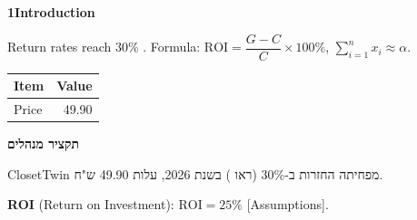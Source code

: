\documentclass[a4paper,11pt]{article}
\begin{document}
{\headfont\bfseries\LARGE 1\quad Introduction}\par\medskip
Return rates reach 30\% \cite{shen2023}. Formula: $\mathrm{ROI}=\dfrac{G-C}{C}\times 100\%$, $\sum_{i=1}^{n} x_i \approx \alpha$.
\begin{center}\begin{tabular}{@{}lr@{}}\toprule Item & Value\\\midrule Price & 49.90\\\bottomrule\end{tabular}\end{center}
\newpage
\begin{otherlanguage}{hebrew}
{\headfont\bfseries\LARGE תקציר מנהלים}\par\medskip
ClosetTwin מפחיתה החזרות ב-30\% (ראו \cite{shen2023}) בשנת 2026, עלות 49.90 ש"ח.\par
\textbf{ROI} (Return on Investment): $\mathrm{ROI}=25\%$ [Assumptions].
\end{otherlanguage}
\newpage
\printbibliography
\end{document}
